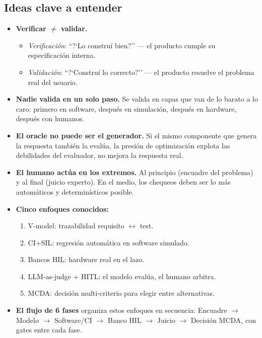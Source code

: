 \documentclass[11pt,a4paper]{article}
\begin{document}
\subsection{Ideas clave a entender}
\begin{itemize}
  \item \textbf{Verificar $\neq$ validar.}
    \begin{itemize}
      \item \textit{Verificaci\'on}: ``?`Lo constru\'i bien?'' --- el producto cumple su especificaci\'on interna.
      \item \textit{Validaci\'on}: ``?`Constru\'i lo correcto?'' --- el producto resuelve el problema real del usuario.
    \end{itemize}
  \item \textbf{Nadie valida en un solo paso.} Se valida en capas que van de lo barato a lo caro: primero en software, despu\'es en simulaci\'on, despu\'es en hardware, despu\'es con humanos.
  \item \textbf{El oracle no puede ser el generador.} Si el mismo componente que genera la respuesta tambi\'en la eval\'ua, la presi\'on de optimizaci\'on explota las debilidades del evaluador, no mejora la respuesta real.
  \item \textbf{El humano act\'ua en los extremos.} Al principio (encuadre del problema) y al final (juicio experto). En el medio, los chequeos deben ser lo m\'as autom\'aticos y determin\'isticos posible.
  \item \textbf{Cinco enfoques conocidos:}
    \begin{enumerate}
      \item V-model: trazabilidad requisito $\leftrightarrow$ test.
      \item CI+SIL: regresi\'on autom\'atica en software simulado.
      \item Bancos HIL: hardware real en el lazo.
      \item LLM-as-judge + HITL: el modelo eval\'ua, el humano arbitra.
      \item MCDA: decisi\'on multi-criterio para elegir entre alternativas.
    \end{enumerate}
  \item \textbf{El flujo de 6 fases} organiza estos enfoques en secuencia: Encuadre $\to$ Modelo $\to$ Software/CI $\to$ Banco HIL $\to$ Juicio $\to$ Decisi\'on MCDA, con gates entre cada fase.
\end{itemize}
\end{document}
